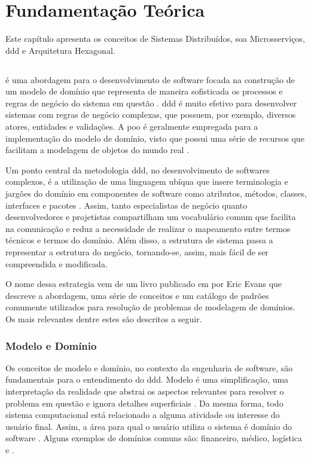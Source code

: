 \chapter{Fundamentação Teórica}
\label{cap:fundamentacao}

Este capítulo apresenta os conceitos de Sistemas Distribuídos, \acrfull{soa} Microsserviços, \acrshort{ddd} e Arquitetura Hexagonal.

\section{} 
 é uma abordagem para o desenvolvimento de software focada na construção de um modelo de domínio que representa de maneira sofisticada os processos e regras de negócio do sistema em questão \cite{dddFowler}. \acrshort{ddd} é muito efetivo para desenvolver sistemas com regras de negócio complexas, que possuem, por exemplo, diversos atores, entidades e validações. A \acrfull{poo} é geralmente empregada para a implementação do modelo de domínio, visto que possui uma série de recursos que facilitam a modelagem de objetos do mundo real \cite{evans2004ddd}.

Um ponto central da metodologia \acrshort{ddd}, no desenvolvimento de softwares complexos, é a utilização de uma linguagem ubíqua que insere terminologia e jargões do domínio em componentes de software como atributos, métodos, classes, interfaces e pacotes \cite{dddFowler}. Assim, tanto especialistas de negócio quanto desenvolvedores e projetistas compartilham um vocabulário comum que facilita na comunicação e reduz a necessidade de realizar o mapeamento entre termos técnicos e termos do domínio. Além disso, a estrutura de sistema passa a representar a estrutura do negócio, tornando-se, assim, mais fácil de ser compreendida e modificada.

O nome dessa estrategia vem de um livro publicado em \citeyear{evans2004ddd} por Eric Evans que descreve a abordagem, uma série de conceitos e um catálogo de  padrões comumente utilizados para resolução de problemas de modelagem de domínios. Os mais relevantes dentre estes são descritos a seguir.

\subsection{Modelo e Domínio}
Os conceitos de modelo e domínio, no contexto da engenharia de software, são fundamentais para o entendimento do \acrshort{ddd}. Modelo é uma simplificação, uma interpretação da realidade que abstrai os aspectos relevantes para resolver o problema em questão e ignora detalhes superficiais \cite{evans2004ddd}. Da mesma forma, todo sistema computacional está relacionado a alguma atividade ou interesse do usuário final. Assim, a área para qual o usuário utiliza o sistema é domínio do software \cite{evans2004ddd}. Alguns exemplos de domínios comuns são: financeiro, médico, logística e .

